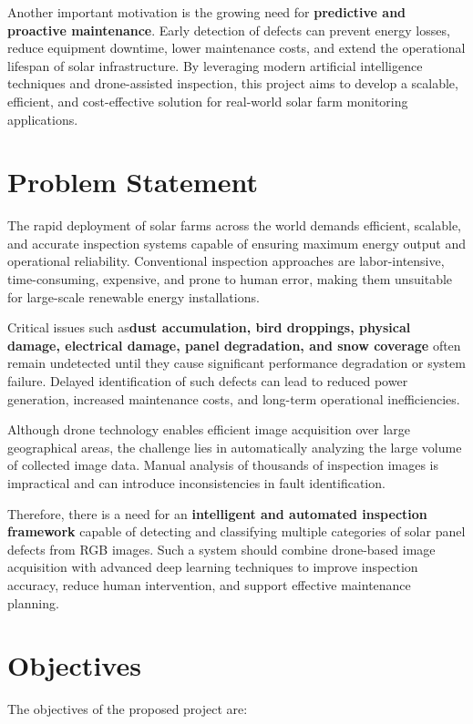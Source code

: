 Another important motivation is the growing need for \textbf{predictive and proactive maintenance}. Early detection of defects can prevent energy losses, reduce equipment downtime, lower maintenance costs, and extend the operational lifespan of solar infrastructure. By leveraging modern artificial intelligence techniques and drone-assisted inspection, this project aims to develop a scalable, efficient, and cost-effective solution for real-world solar farm monitoring applications.

\section{Problem Statement}

The rapid deployment of solar farms across the world demands efficient, scalable, and accurate inspection systems capable of ensuring maximum energy output and operational reliability. Conventional inspection approaches are labor-intensive, time-consuming, expensive, and prone to human error, making them unsuitable for large-scale renewable energy installations.

Critical issues such as\textbf{dust accumulation, bird droppings, physical damage, electrical damage, panel degradation, and snow coverage} often remain undetected until they cause significant performance degradation or system failure. Delayed identification of such defects can lead to reduced power generation, increased maintenance costs, and long-term operational inefficiencies.

Although drone technology enables efficient image acquisition over large geographical areas, the challenge lies in automatically analyzing the large volume of collected image data. Manual analysis of thousands of inspection images is impractical and can introduce inconsistencies in fault identification.

Therefore, there is a need for an \textbf{intelligent and automated inspection framework} capable of detecting and classifying multiple categories of solar panel defects from RGB images. Such a system should combine drone-based image acquisition with advanced deep learning techniques to improve inspection accuracy, reduce human intervention, and support effective maintenance planning.

\section{Objectives}

The objectives of the proposed project are:

